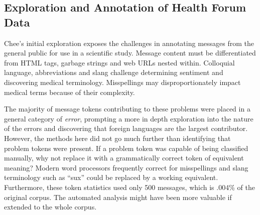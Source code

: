 \documentclass[twoside,11pt]{article}
\begin{document}
\subsection{Exploration and Annotation of Health Forum Data}
Chee's initial exploration exposes the challenges in annotating messages from the general public for use in a scientific study. Message content must be differentiated from HTML tags, garbage strings and web URLs nested within. Colloquial language, abbreviations and slang challenge determining sentiment and discovering medical terminology. Misspellings may disproportionately impact medical terms because of their complexity.
\par The majority of message tokens contributing to these problems were placed in a general category of \textit{error}, prompting a more in depth exploration into the nature of the errors and discovering that foreign languages are the largest contributor. However, the methods here did not go much further than identifying that problem tokens were present. If a problem token was capable of being classified manually, why not replace it with a grammatically correct token of equivalent meaning? Modern word processors frequently correct for misspellings and slang terminology such as ``sux'' could be replaced by a working equivalent. Furthermore, these token statistics used only 500 messages, which is .004\% of the original corpus. The automated analysis might have been more valuable if extended to the whole corpus.
\end{document}
